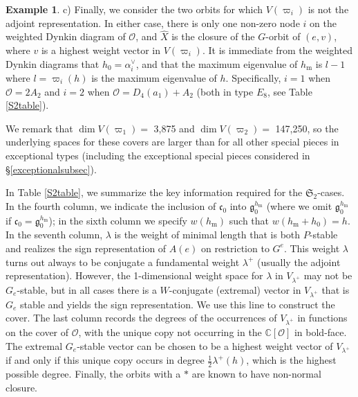 \documentclass{amsart}
\theoremstyle{definition}
\newtheorem{example}[theorem]{Example}
\newcommand{\C}{\mathbb{C}}
\newcommand{\m}{\mathrm{m}}
\newcommand{\g}{\mathfrak{g}}
\newcommand{\cg}{\mathfrak{c}}
\newcommand{\0}{\mathcal{O}}
\begin{document}
\begin{example}
c) Finally, we consider the two orbits for which $V(\varpi_i)$ is not the adjoint representation.
In either case, there is only one non-zero node $i$ on the weighted Dynkin diagram of $\0$, and $\hat{X}$ is the closure of the $G$-orbit of $(e,v)$, where $v$ is a highest weight vector in $V(\varpi_i)$.
It is immediate from the weighted Dynkin diagrams that $h_0=\alpha_i^\vee$, and that the maximum eigenvalue of $h_\m$ is $l-1$ where $l=\varpi_i(h)$ is the maximum eigenvalue of $h$.
Specifically, $i=1$ when $\0=2A_2$ and $i=2$ when $\0=D_4(a_1)+A_2$ (both in type $E_8$, see Table \ref{S2table}).

We remark that $\dim V(\varpi_1)=$ 3,875 and $\dim V(\varpi_2)=$ 147,250, so the underlying spaces for these covers are larger than for all other special pieces in exceptional types (including the exceptional special pieces considered in \S \ref{exceptionalsubsec}).
\end{example}


In Table \ref{S2table}, we summarize the key information required for the $\mathfrak{S}_2$-cases.
In the fourth column, we indicate the inclusion of $\cg_0$ into $\g^{h_\m}_0$ (where we omit $\g^{h_\m}_0$ if $\cg_0=\g^{h_\m}_0$); in the sixth column we specify $w(h_\m)$ such that $w(h_\m+h_0)=h$.
In the seventh column, $\lambda$ is the weight of minimal length that is both $P$-stable and realizes the sign representation of $A(e)$ on restriction to $G^e$. 
This weight $\lambda$ turns out always to be conjugate a fundamental weight $\lambda^+$ (usually the adjoint representation).
However, the 1-dimensional weight space for $\lambda$ in $V_{\lambda^+}$ may not be 
$G_e$-stable, but in all cases there is a $W$-conjugate (extremal) vector in $V_{\lambda^+}$  that is $G_e$ stable and yields the sign representation.  
We use this line to construct the cover. 
The last column records the degrees of the occurrences of $V_{\lambda^+}$ in functions on the cover of $\0$, with the unique copy not occurring in the $\C[\0]$ in bold-face.  
The extremal $G_e$-stable vector can be chosen to be a highest weight vector of $V_{\lambda^+}$
if and only if this unique copy occurs in degree $\frac{1}{2}\lambda^+(h)$, which is the highest possible degree.  %
Finally, the orbits with a $*$ are known to have non-normal closure.
\end{document}

